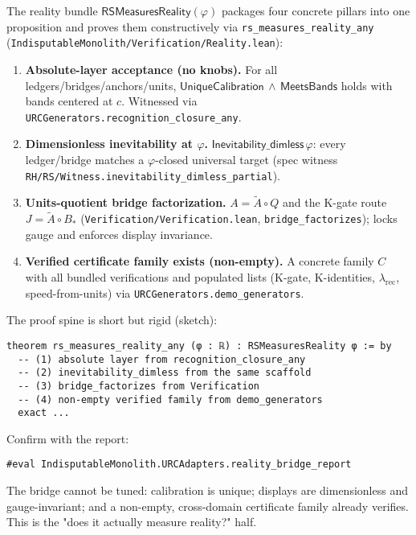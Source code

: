 \documentclass[11pt,a4paper,twoside]{article}
\numberwithin{equation}{section}
\newcommand{\phigr}{\varphi} %
\renewcommand{\phi}{\varphi}
\newcommand{\Atilde}{\tilde{A}}
\newcommand{\Bstar}{B_*}
\theoremstyle{customthm}
\theoremstyle{customdef}
\theoremstyle{customrem}
\begin{document}
The reality bundle \(\mathsf{RSMeasuresReality}(\phi)\) packages four concrete pillars into one proposition and proves them constructively via \texttt{rs\_measures\_reality\_any} (\texttt{IndisputableMonolith/Verification/Reality.lean}):
\begin{enumerate}[leftmargin=*]
  \item \textbf{Absolute-layer acceptance (no knobs).} For all ledgers/bridges/anchors/units, \(\mathsf{UniqueCalibration}\,\wedge\,\mathsf{MeetsBands}\) holds with bands centered at \(c\). Witnessed via \texttt{URCGenerators.recognition\_closure\_any}.
  \item \textbf{Dimensionless inevitability at \(\phigr\).} \(\mathsf{Inevitability\_dimless}\,\phi\): every ledger/bridge matches a \(\phi\)-closed universal target (spec witness \texttt{RH/RS/Witness.inevitability\_dimless\_partial}).
  \item \textbf{Units-quotient bridge factorization.} \(A = \Atilde\!\circ Q\) and the K-gate route \(J=\Atilde\!\circ \Bstar\) (\texttt{Verification/Verification.lean}, \texttt{bridge\_factorizes}); locks gauge and enforces display invariance.
  \item \textbf{Verified certificate family exists (non-empty).} A concrete family \(C\) with all bundled verifications and populated lists (K-gate, K-identities, \(\lambda_{\mathrm{rec}}\), speed-from-units) via \texttt{URCGenerators.demo\_generators}.
\end{enumerate}

The proof spine is short but rigid (sketch):

\begin{lstlisting}
theorem rs_measures_reality_any (φ : ℝ) : RSMeasuresReality φ := by
  -- (1) absolute layer from recognition_closure_any
  -- (2) inevitability_dimless from the same scaffold
  -- (3) bridge_factorizes from Verification
  -- (4) non-empty verified family from demo_generators
  exact ...
\end{lstlisting}

Confirm with the report:

\begin{lstlisting}
#eval IndisputableMonolith.URCAdapters.reality_bridge_report
\end{lstlisting}

\begin{resultbox}[Meaning]
The bridge cannot be tuned: calibration is unique; displays are dimensionless and gauge-invariant; and a non-empty, cross-domain certificate family already verifies. This is the "does it actually measure reality?" half.
\end{resultbox}
\end{document}
